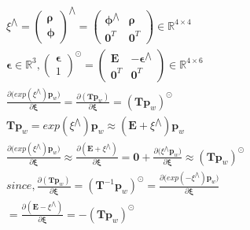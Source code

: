 \documentclass{article}
\begin{document}
\begin{CJK*}{GBK}{song}
\begin{equation}\left.\begin{aligned}
&
\xi^{\bigwedge}=
\begin{pmatrix}
\boldsymbol{\rho}\\\boldsymbol{\phi}
\end{pmatrix}^{\bigwedge}=
\begin{pmatrix}
\boldsymbol{\phi}^{\bigwedge}&\boldsymbol{\rho}
\\\textbf{0}^T&\textbf{0}^T
\end{pmatrix}\in{\mathbb{R}^{4\times{4}}}
\\&
\boldsymbol{\epsilon}\in{\mathbb{R}^3},
\begin{pmatrix}
\boldsymbol{\epsilon}\\1
\end{pmatrix}^{\odot}
=\begin{pmatrix}
\textbf{E}&-\boldsymbol{\epsilon}^{\bigwedge}\\\textbf{0}^T&\textbf{0}^T
\end{pmatrix}\in{\mathbb{R}^{4\times{6}}}
\\&
\frac{\partial{(exp(\xi^{\bigwedge})\textbf{p}_w})}{\partial{\boldsymbol{\xi}}} =
\frac{\partial{(\textbf{T}\textbf{p}_w)}}{\partial{\boldsymbol{\xi}}} = (\textbf{T}\textbf{p}_w)^{\odot}
\\&
\textbf{T}\textbf{p}_w=exp(\xi^{\bigwedge})\textbf{p}_w\approx(\textbf{E}+\xi^{\bigwedge})\textbf{p}_w
\\&
\frac{\partial{(exp(\xi^{\bigwedge})\textbf{p}_w})}{\partial{\boldsymbol{\xi}}}\approx
\frac{\partial{(\textbf{E}+\xi^{\bigwedge})}}{\partial{\boldsymbol{\xi}}}=
\textbf{0}+\frac{\partial{(\xi^{\bigwedge}\textbf{p}_w})}{\partial{\boldsymbol{\xi}}}\approx(\textbf{T}\textbf{p}_w)^{\odot}
\\&
since,\frac{\partial{(\textbf{T}\textbf{p}_w)}}{\partial{\boldsymbol{\xi}}} = (\textbf{T}^{-1}\textbf{p}_w)^{\odot}=
\frac{\partial{(exp(-\xi^{\bigwedge})\textbf{p}_w})}{\partial{\boldsymbol{\xi}}}
\\&
=\frac{\partial{(\textbf{E}-\xi^{\bigwedge})}}{\partial{\boldsymbol{\xi}}}=-(\textbf{T}\textbf{p}_w)^{\odot}
\end{aligned}\tag{2.2}\right.\end{equation}


\end{CJK*}
\end{document}
